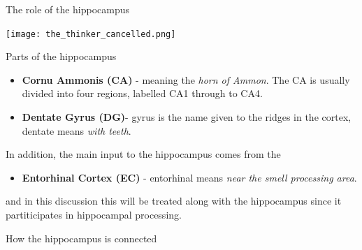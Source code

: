 \documentclass{beamer}
\begin{document}
\begin{frame}{The role of the hippocampus}
  \begin{center}
    \texttt{[image: the\_thinker\_cancelled.png]}
  \end{center}
      \vfill
\end{frame}

\begin{frame}{Parts of the hippocampus}
\begin{itemize}
\item \textbf{Cornu Ammonis (CA)} - meaning the \textsl{horn of Ammon}. The CA is usually divided
  into four regions, labelled CA1 through to CA4.
\item \textbf{Dentate Gyrus (DG)}- gyrus is the name given to the ridges in the
  cortex, dentate means \textsl{with teeth}.
\end{itemize}
In addition, the main input to the hippocampus comes from the
\begin{itemize}
\item \textbf{Entorhinal Cortex (EC)} - entorhinal means \textsl{near the smell processing area}. 
\end{itemize}
and in this discussion this will be treated along with the hippocampus
since it partiticipates in hippocampal processing.
\end{frame}

\begin{frame}{How the hippocampus is connected}
  \begin{center}
\end{center}
\end{frame}
\end{document}

